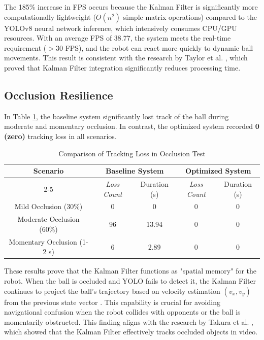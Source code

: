 \documentclass[12pt,a4paper]{article}
\begin{document}
The 185\% increase in FPS occurs because the Kalman Filter is significantly more computationally lightweight ($O(n^2)$ simple matrix operations) compared to the YOLOv8 neural network inference, which intensively consumes CPU/GPU resources. With an average FPS of 38.77, the system meets the real-time requirement ($>$30 FPS), and the robot can react more quickly to dynamic ball movements. This result is consistent with the research by Taylor et al. \cite{Taylor2016}, which proved that Kalman Filter integration significantly reduces processing time.

\subsection{Occlusion Resilience}
In Table \ref{tab:occlusion}, the baseline system significantly lost track of the ball during moderate and momentary occlusion. In contrast, the optimized system recorded \textbf{0 (zero)} tracking loss in all scenarios.

\begin{table}[H]
\centering
\caption{Comparison of Tracking Loss in Occlusion Test}
\label{tab:occlusion}
\begin{tabular}{|c|c|c|c|c|}
\hline
\multirow{2}{*}{\textbf{Scenario}} & \multicolumn{2}{c|}{\textbf{Baseline System}} & \multicolumn{2}{c|}{\textbf{Optimized System}} \\
\cline{2-5}
& \textit{Loss Count} & Duration (s) & \textit{Loss Count} & Duration (s) \\
\hline
Mild Occlusion (30\%) & 0 & 0 & 0 & 0 \\
Moderate Occlusion (60\%) & 96 & 13.94 & 0 & 0 \\
Momentary Occlusion (1-2 s) & 6 & 2.89 & 0 & 0 \\
\hline
\end{tabular}
\end{table}

These results prove that the Kalman Filter functions as "spatial memory" for the robot. When the ball is occluded and YOLO fails to detect it, the Kalman Filter continues to project the ball's trajectory based on velocity estimation $(v_x, v_y)$ from the previous state vector \cite{Saputra2023}. This capability is crucial for avoiding navigational confusion when the robot collides with opponents or the ball is momentarily obstructed. This finding aligns with the research by Takura et al. \cite{Takura2021}, which showed that the Kalman Filter effectively tracks occluded objects in video.
\end{document}

